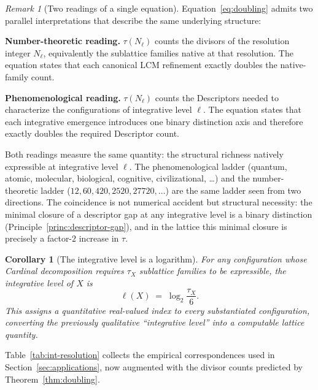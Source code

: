 \documentclass[11pt,a4paper]{article}
\newtheorem{corollary}[theorem]{Corollary}
\theoremstyle{definition}
\theoremstyle{remark}
\newtheorem{remark}[theorem]{Remark}
\begin{document}
\begin{remark}[Two readings of a single equation]\label{rem:two-readings}
Equation~\eqref{eq:doubling} admits two parallel interpretations that describe the same underlying structure:

\textbf{Number-theoretic reading.} $\tau(N_{\ell})$ counts the divisors of the resolution integer $N_{\ell}$, equivalently the sublattice families native at that resolution. The equation states that each canonical LCM refinement exactly doubles the native-family count.

\textbf{Phenomenological reading.} $\tau(N_{\ell})$ counts the Descriptors needed to characterize the configurations of integrative level $\ell$. The equation states that each integrative emergence introduces one binary distinction axis and therefore exactly doubles the required Descriptor count.

Both readings measure the same quantity: the structural richness natively expressible at integrative level $\ell$. The phenomenological ladder (quantum, atomic, molecular, biological, cognitive, civilizational, \ldots) and the number-theoretic ladder ($12, 60, 420, 2520, 27720, \ldots$) are the same ladder seen from two directions. The coincidence is not numerical accident but structural necessity: the minimal closure of a descriptor gap at any integrative level is a binary distinction (Principle~\ref{princ:descriptor-gap}), and in the lattice this minimal closure is precisely a factor-$2$ increase in $\tau$.
\end{remark}

\begin{corollary}[The integrative level is a logarithm]\label{cor:level-log}
For any configuration whose Cardinal decomposition requires $\tau_{X}$ sublattice families to be expressible, the integrative level of $X$ is
\[
\ell(X) \;=\; \log_{2}\!\frac{\tau_{X}}{6}.
\]
This assigns a quantitative real-valued index to every substantiated configuration, converting the previously qualitative ``integrative level'' into a computable lattice quantity.
\end{corollary}

Table~\ref{tab:int-resolution} collects the empirical correspondences used in Section~\ref{sec:applications}, now augmented with the divisor counts predicted by Theorem~\ref{thm:doubling}.
\end{document}

